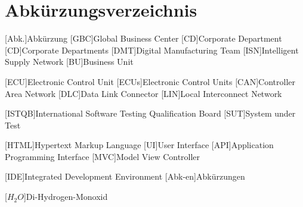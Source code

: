 
\chapter*{Abkürzungsverzeichnis}                   %

\begin{acronym}[DHBW]
 [Abk.]{Abkürzung}
 [GBC]{Global Business Center}
 [CD]{Corporate Department}
 [CD]{Corporate Departments}
 [DMT]{Digital Manufacturing Team}
 [ISN]{Intelligent Supply Network}
 [BU]{Business Unit}
 
 [ECU]{Electronic Control Unit}
 [ECUs]{Electronic Control Units}
 [CAN]{Controller Area Network}
 [DLC]{Data Link Connector}
 [LIN]{Local Interconnect Network}
 
 [ISTQB]{International Software Testing Qualification Board}
 [SUT]{System under Test}
 
 [HTML]{Hypertext Markup Language}
 [UI]{User Interface}
 [API]{Application Programming Interface}
 [MVC]{Model View Controller}

 [IDE]{Integrated Development Environment}
 [Abk-en]{Abkürzungen}

 [\ensuremath{H_2O}]{Di-Hydrogen-Monoxid}

\end{acronym}
